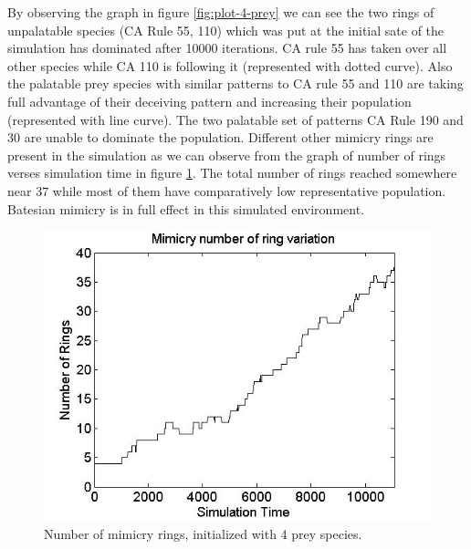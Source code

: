 By observing the graph in figure \ref{fig:plot-4-prey} we can see the two rings of unpalatable species (CA Rule 55, 110) which was put at the initial sate of the simulation has dominated after 10000 iterations. CA rule 55 has taken over all other species while CA 110 is following it (represented with dotted curve). Also the palatable prey species with similar patterns to CA rule 55 and 110 are taking full advantage of their deceiving pattern and increasing their population (represented with line curve). The two palatable set of patterns CA Rule 190 and 30 are unable to dominate the population. Different other mimicry rings are present in the simulation as we can observe from the graph of number of rings verses simulation time in figure \ref{fig:ringSize10k-4Prey}. The total number of rings reached somewhere near 37 while most of them have comparatively low representative population. Batesian mimicry is in full effect in this simulated environment.

\begin{figure}[H]
	\centering
	\includegraphics[scale=0.50]{images/ringSize10k-4Prey}
	\caption[Number of mimicry rings (4 prey species)]{Number of mimicry rings, initialized with 4 prey species.}
	\label{fig:ringSize10k-4Prey}
\end{figure}

